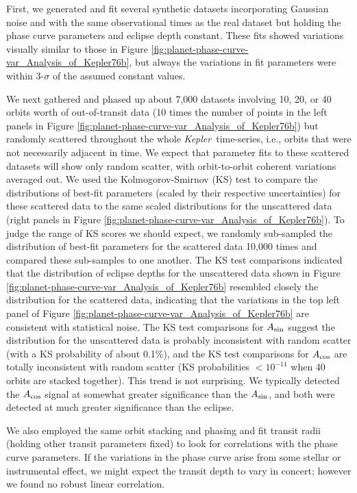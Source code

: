 \documentclass[manuscript]{aastex62}
\newcommand{\kepler}{{\it Kepler}}
\begin{document}
First, we generated and fit several synthetic datasets incorporating Gaussian noise and with the same observational times as the real dataset but holding the phase curve parameters and eclipse depth constant. These fits showed variations visually similar to those in Figure \ref{fig:planet-phase-curve-var_Analysis_of_Kepler76b}, but always the variations in fit parameters were within 3-$\sigma$ of the assumed constant values.

We next gathered and phased up about 7,000 datasets involving 10, 20, or 40 orbits worth of out-of-transit data (10 times the number of points in the left panels in Figure \ref{fig:planet-phase-curve-var_Analysis_of_Kepler76b}) but randomly scattered throughout the whole \kepler\ time-series, i.e., orbits that were not necessarily adjacent in time. We expect that parameter fits to these scattered datasets will show only random scatter, with orbit-to-orbit coherent variations averaged out. We used the Kolmogorov-Smirnov (KS) test \citep[p.~730]{Press:2007:NRE:1403886} to compare the distributions of best-fit parameters (scaled by their respective uncertainties) for these scattered data to the same scaled distributions for the unscattered data (right panels in Figure \ref{fig:planet-phase-curve-var_Analysis_of_Kepler76b}). To judge the range of KS scores we should expect, we randomly sub-sampled the distribution of best-fit parameters for the scattered data 10,000 times and compared these sub-samples to one another. The KS test comparisons indicated that the distribution of eclipse depths for the unscattered data shown in Figure \ref{fig:planet-phase-curve-var_Analysis_of_Kepler76b} resembled closely the distribution for the scattered data, indicating that the variations in the top left panel of Figure \ref{fig:planet-phase-curve-var_Analysis_of_Kepler76b} are consistent with statistical noise. The KS test comparisons for $A_{\rm sin}$ suggest the distribution for the unscattered data is probably inconsistent with random scatter (with a KS probability of about 0.1\%), and the KS test comparisons for $A_{\rm cos}$ are totally inconsistent with random scatter (KS probabilities $<10^{-11}$ when 40 orbits are stacked together). This trend is not surprising. We typically detected the $A_{\rm cos}$ signal at somewhat greater significance than the $A_{\rm sin}$, and both were detected at much greater significance than the eclipse. 

We also employed the same orbit stacking and phasing and fit transit radii (holding other transit parameters fixed) to look for correlations with the phase curve parameters. If the variations in the phase curve arise from some stellar or instrumental effect, we might expect the transit depth to vary in concert; however we found no robust linear correlation.
\end{document}
